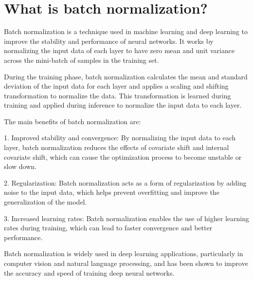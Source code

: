 \section{What is batch normalization?}
Batch normalization is a technique used in machine learning and deep learning to improve the stability and performance of neural networks. It works by normalizing the input data of each layer to have zero mean and unit variance across the mini-batch of samples in the training set.

During the training phase, batch normalization calculates the mean and standard deviation of the input data for each layer and applies a scaling and shifting transformation to normalize the data. This transformation is learned during training and applied during inference to normalize the input data to each layer.

The main benefits of batch normalization are:

1. Improved stability and convergence: By normalizing the input data to each layer, batch normalization reduces the effects of covariate shift and internal covariate shift, which can cause the optimization process to become unstable or slow down.

2. Regularization: Batch normalization acts as a form of regularization by adding noise to the input data, which helps prevent overfitting and improve the generalization of the model.

3. Increased learning rates: Batch normalization enables the use of higher learning rates during training, which can lead to faster convergence and better performance.

Batch normalization is widely used in deep learning applications, particularly in computer vision and natural language processing, and has been shown to improve the accuracy and speed of training deep neural networks.

